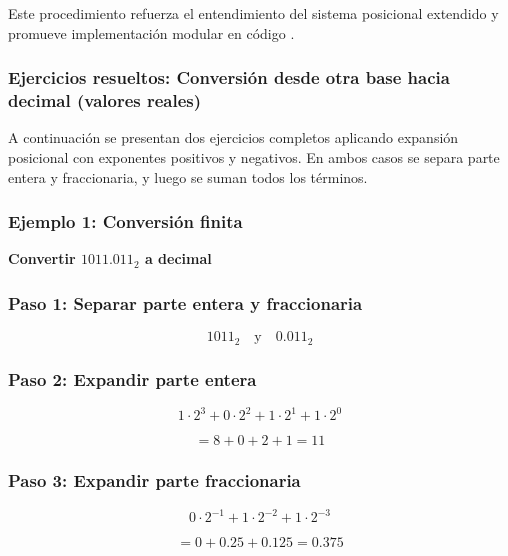 \documentclass[12pt,twoside]{book}
\begin{document}
						\noindent
						Este procedimiento refuerza el entendimiento del sistema posicional extendido y promueve implementación modular en código \cite{Wirth1976Algorithms,Manzano2017Programacion,Gaddis2022Starting}.
						
						\subsubsection*{Ejercicios resueltos: Conversión desde otra base hacia decimal (valores reales)}
						
						\noindent
						A continuación se presentan dos ejercicios completos aplicando expansión posicional con exponentes positivos y negativos. En ambos casos se separa parte entera y fraccionaria, y luego se suman todos los términos.
						
						\subsubsection*{Ejemplo 1: Conversión finita}
						
						\noindent
						\textbf{Convertir $1011.011_2$ a decimal}
						
						\subsubsection*{Paso 1: Separar parte entera y fraccionaria}
						
						\[
						1011_2 \quad \text{y} \quad 0.011_2
						\]
						
						\subsubsection*{Paso 2: Expandir parte entera}
						
						\[
						1\cdot2^3 + 0\cdot2^2 + 1\cdot2^1 + 1\cdot2^0
						\]
						
						\[
						= 8 + 0 + 2 + 1 = 11
						\]
						
						\subsubsection*{Paso 3: Expandir parte fraccionaria}
						
						\[
						0\cdot2^{-1} + 1\cdot2^{-2} + 1\cdot2^{-3}
						\]
						
						\[
						= 0 + 0.25 + 0.125 = 0.375
						\]
						
\end{document}
